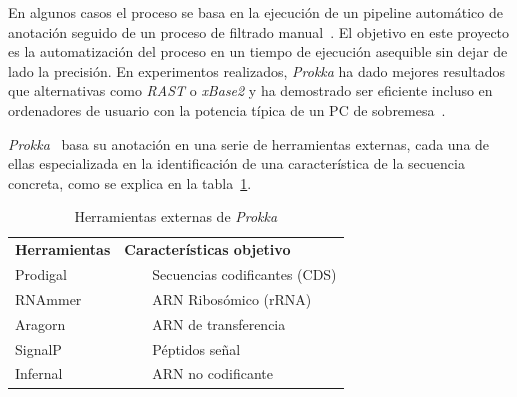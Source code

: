 En algunos casos el proceso se basa en la ejecución de un pipeline automático de anotación seguido de un proceso de filtrado manual~\cite{Stothard2006}. El objetivo en este proyecto es la automatización del proceso en un tiempo de ejecución asequible sin dejar de lado la precisión. En experimentos realizados, \textit{Prokka} ha dado mejores resultados que alternativas como \textit{RAST} o \textit{xBase2} y ha demostrado ser eficiente incluso en ordenadores de usuario con la potencia típica de un PC de sobremesa~\cite{Seemann2014}.

\textit{Prokka}~\cite{Seemann2014} basa su anotación en una serie de herramientas  externas, cada una de ellas especializada en la identificación de una característica de la secuencia concreta, como se explica en la tabla~\ref{table:ProkkaTools}.

\begin{table}[!htb]

\begin{center}
\begin{tabularx}{\textwidth}{bb}
\arrayrulecolor{NavyBlue}\hline
\textbf{\textcolor{NavyBlue}{Herramientas}} &
\textbf{\textcolor{NavyBlue}{Características objetivo}}\\
\quad Prodigal~\cite{Hyatt2010} &
\begin{minipage}[t]{\linewidth}
~~~~Secuencias codificantes (CDS)
\end{minipage}\\

\quad RNAmmer~\cite{Lagesen2007} &
\begin{minipage}[t]{\linewidth}
~~~~ARN Ribosómico (rRNA)
\end{minipage}\\

\quad Aragorn~\cite{Laslett2004} &
\begin{minipage}[t]{\linewidth}
~~~~ARN de transferencia
\end{minipage}\\

\quad SignalP~\cite{Petersen2011} &
\begin{minipage}[t]{\linewidth}
~~~~Péptidos señal
\end{minipage}\\

\quad Infernal~\cite{Kolbe2011} &
\begin{minipage}[t]{\linewidth}
~~~~ARN no codificante
\end{minipage}\\
\hline
\end{tabularx}
\end{center}
\label{table:ProkkaTools}
\caption{Herramientas externas de \textit{Prokka}}
\end{table}

